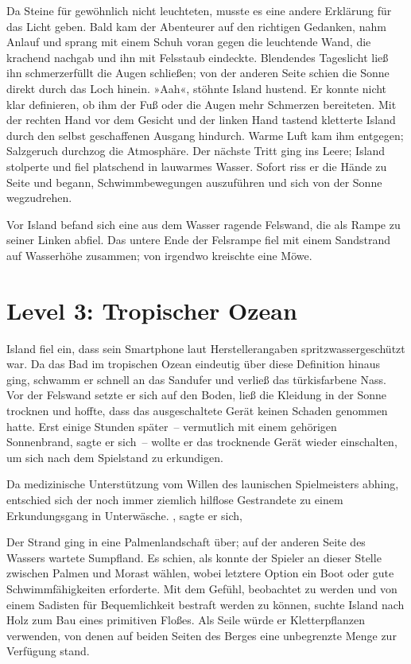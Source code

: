 Da Steine für gewöhnlich nicht leuchteten, musste es eine andere Erklärung für das Licht geben. Bald kam der Abenteurer auf den richtigen Gedanken, nahm Anlauf und sprang mit einem Schuh voran gegen die leuchtende Wand, die krachend nachgab und ihn mit Felsstaub eindeckte. Blendendes Tageslicht ließ ihn schmerzerfüllt die Augen schließen; von der anderen Seite schien die Sonne direkt durch das Loch hinein. »Aah«, stöhnte Island hustend. Er konnte nicht klar definieren, ob ihm der Fuß oder die Augen mehr Schmerzen bereiteten. Mit der rechten Hand vor dem Gesicht und der linken Hand tastend kletterte Island durch den selbst geschaffenen Ausgang hindurch. Warme Luft kam ihm entgegen; Salzgeruch durchzog die Atmosphäre. Der nächste Tritt ging ins Leere; Island stolperte und fiel platschend in lauwarmes Wasser. Sofort riss er die Hände zu Seite und begann, Schwimmbewegungen auszuführen und sich von der Sonne wegzudrehen.

Vor Island befand sich eine aus dem Wasser ragende Felswand, die als Rampe zu seiner Linken abfiel. Das untere Ende der Felsrampe fiel mit einem Sandstrand auf Wasserhöhe zusammen; von irgendwo kreischte eine Möwe.

\section{Level 3: Tropischer Ozean}

Island fiel ein, dass sein Smartphone laut Herstellerangaben spritzwassergeschützt war. Da das Bad im tropischen Ozean eindeutig über diese Definition hinaus ging, schwamm er schnell an das Sandufer und verließ das türkisfarbene Nass. Vor der Felswand setzte er sich auf den Boden, ließ die Kleidung in der Sonne trocknen und hoffte, dass das ausgeschaltete Gerät keinen Schaden genommen hatte. Erst einige Stunden später~– vermutlich mit einem gehörigen Sonnenbrand, sagte er sich~– wollte er das trocknende Gerät wieder einschalten, um sich nach dem Spielstand zu erkundigen.

Da medizinische Unterstützung vom Willen des launischen Spielmeisters abhing, entschied sich der noch immer ziemlich hilflose Gestrandete zu einem Erkundungsgang in Unterwäsche. , sagte er sich, 

Der Strand ging in eine Palmenlandschaft über; auf der anderen Seite des Wassers wartete Sumpfland. Es schien, als konnte der Spieler an dieser Stelle zwischen Palmen und Morast wählen, wobei letztere Option ein Boot oder gute Schwimmfähigkeiten erforderte. Mit dem Gefühl, beobachtet zu werden und von einem Sadisten für Bequemlichkeit bestraft werden zu können, suchte Island nach Holz zum Bau eines primitiven Floßes. Als Seile würde er Kletterpflanzen verwenden, von denen auf beiden Seiten des Berges eine unbegrenzte Menge zur Verfügung stand.

